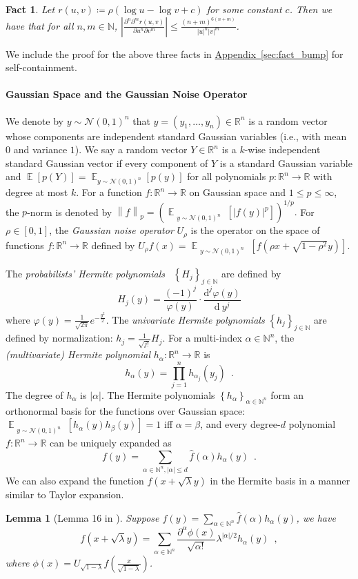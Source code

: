 \documentclass[12pt]{article}
\newtheorem{fact}[theorem]{Fact}
\newtheorem{lemma}[theorem]{Lemma}
\newcommand{\app}[1]{\hyperref[sec:#1]{Appendix~\ref*{sec:#1}}}
\newcommand{\N}{\mathbb{N}}  \newcommand{\R}{\mathbb{R}} \newcommand{\C}{\mathbb{C}} \newcommand{\U}{\mathbb{U}} \renewcommand{\d}{\mathrm{d}} \DeclareMathOperator*{\E}{\mathbb{E}}  \newcommand{\so}{\mathrm{SO}} \newcommand{\s}{\mathrm{S}} \newcommand{\su}{\mathrm{SU}} \renewcommand{\i}{\mathrm{i}} \newcommand{\A}{\mathcal{A}}  \newcommand{\B}{\mathcal{B}} \newcommand{\CC}{\mathcal{C}} \newcommand{\D}{\mathcal{D}} \newcommand{\F}{\mathcal{F}} \renewcommand{\H}{\mathcal{H}} \newcommand{\K}{\mathcal{K}} \newcommand{\NN}{\mathcal{N}} \newcommand{\V}{\mathcal{V}} \newcommand{\X}{\mathcal{X}} \newcommand{\Y}{\mathcal{Y}} \renewcommand{\S}{\mathcal{S}} \newcommand{\SR}{\mathcal{S}_{\R}} \newcommand{\SC}{\mathcal{S}_{\C}} \newcommand{\EE}{\mathcal{E}}  \newcommand{\PP}{\mathcal{P}} \newcommand{\KK}{\widetilde{K}} \newcommand{\LL}{\widetilde{L}} \newcommand{\W}{\widehat{W}} \newcommand{\f}{\hat{f}} \newcommand{\g}{\hat{g}} \newcommand{\h}{\hat{h}} \newcommand{\bit}[1]{\{0,1\}^{#1}} \newcommand{\wrt}{w.r.t.~} \newcommand{\us}{\overset{\$}{\leftarrow}} \newcommand{\set}[1]{\left\{#1\right\}} \newcommand{\lhs}{\mathrm{LHS}} \newcommand{\expec}[1]{\E\!\Br{#1}} \newcommand{\expect}[2]{\E_{\substack{#1}}\!\Br{#2}} \newcommand{\prob}[2]{\underset{#1}{\mathrm{Pr}}\!\Br{#2}} \newcommand{\cf}{\widetilde{f}} \newcommand{\cg}{\widetilde{g}} \newcommand{\ch}{\widetilde{h}} \newcommand{\ck}{\widetilde{K}} \newcommand{\rep}[2]{\br{#1}_{#2}} \newcommand{\AND}[1]{\mathrm{AND}\!\br{#1}}
\newcommand{\br}[1]{\left(#1\right)} \newcommand{\Br}[1]{\left[#1\right]} \newcommand{\st}[1]{\left\{#1\right\}} \newcommand{\tr}[1]{\mathrm{Tr}\!\Br{#1}} \newcommand{\abs}[1]{\left|#1 \right|} \newcommand{\norm}[1]{\left\lVert #1 \right\rVert} \newcommand{\agl}[2]{\theta^{\br{#1}}_{#2}} \newcommand{\aglp}[2]{{\theta'}^{\br{#1}}_{#2}} \newcommand{\lint}[1]{\left\lfloor#1\right\rfloor} \newcommand{\poly}[1]{\mathrm{poly}\!\br{#1}} \newcommand{\negl}[1]{\mathrm{negl}\!\br{#1}} \newcommand{\de}[1]{\mathrm{d}#1} \newcommand{\val}[1]{\mathrm{val}\!\br{#1}} \newcommand{\vall}[1]{\mathrm{val}\br{#1}} \newcommand{\nd}[1]{\mathcal{N}\!\br{#1}} \newcommand{\ketbratwo}[2]{\ket{#1} \hspace{-0.4em}\bra{#2}} \newcommand{\ketbra}[1]{\ketbratwo{#1}{#1}} \newcommand{\id}{\ensuremath{\mathds{1}}} \newcommand{\ogroup}[1]{\mathrm{O}\!\br{#1}} \newcommand{\ugroup}[1]{\mathrm{U}\!\br{#1}} \newcommand{\td}{\mathrm{TD}} \newcommand{\tv}[1]{\norm{#1}_{\mathrm{TV}}} \newcommand {\defeq} {\ensuremath{ \stackrel{\mathrm{def}}{=} }} \newcommand{\vdim}{\ensuremath{N}} \newcommand{\dimin}{\ensuremath{n}} \newcommand{\dimout}{\ensuremath{m}} \newcommand{\ncopy}{\ell} \newcommand{\hspacein}{\H_\mathrm{in}} \newcommand{\hspaceout}{\H_\mathrm{out}} \newcommand{\Sin}{\S(\hspacein)} \newcommand{\Sout}{\S(\hspaceout)} \newcommand{\haar}{\ensuremath{\mu}} \newcommand{\tensorhaar}{\ensuremath{\eta}} \newcommand{\tensorsrss}{\ensuremath{\nu}} \newcommand{\qadvice}{\ensuremath{\rho}} \newcommand{\tp}{\otimes} \newcommand{\wone}[2]{W_1\!\br{#1,#2}}
\begin{document}
\begin{fact}\label{fact:deri}
	Let $r(u,v) \coloneq \rho( \log u-\log v + c )$ for some constant $c$. Then we have that for all $n,m\in \N$,
	$ \abs{ \frac{ \partial^n \partial^m r(u,v) }{ \partial u^n \partial v^m } } \leq \frac{(n+m)^{6(n+m)}}{\abs{u}^n \abs{v}^m} $.
\end{fact}
\noindent We include the proof for the above three facts in \app{fact_bump} for self-containment.


\paragraph{Gaussian Space and the Gaussian Noise Operator}
We denote by $y\sim \NN(0,1)^n$ that $y = (y_1,\dots,y_n)\in\R^n$ is a random vector
whose components are independent standard Gaussian variables (i.e., with mean $0$ and variance $1$).
We say a random vector $Y\in\R^n$ is a $k$-wise independent standard Gaussian vector if every component of $Y$ is a standard Gaussian variable and
$\E[p(Y)] = \E_{y\sim \NN(0,1)^n}[p(y)]$ for all polynomials $p:\R^n\to \R$ with degree at most $k$.
For a function $f:\R^n\to \R$ on Gaussian space and $1\leq p\leq \infty$, the $p$-norm is denoted by
$
	\norm{f}_p = \br{\expect{y\sim \NN(0,1)^n}{\abs{f(y)}^p}}^{1/p}.
$
For $\rho\in[0,1]$, the \emph{Gaussian noise operator} $U_{\rho}$ is the operator on the space of functions $f:\R^n\to\R$ defined by
$
	U_{\rho}f(x) = \expect{y\sim \NN(0,1)^n}{f(\rho x+\sqrt{1-\rho^2}y)}.
$

The \emph{probabilists' Hermite polynomials}~\cite[Section 11]{O14} $\st{H_j}_{j\in\N}$ are defined by
\[
	H_j(y) = \frac{(-1)^{j}}{\varphi(y)}\cdot \frac{\mathrm{d}^j\varphi(y)}{\mathrm{d}\ y^j}
\]
where $\varphi(y)= \frac{1}{\sqrt{2\pi}}e^{-\frac{y^2}{2}}$.
The \emph{univariate Hermite polynomials} $\st{h_j}_{j\in\N}$ are defined by normalization: $h_{j} = \frac{1}{\sqrt{j!}}H_j$.
For a multi-index $\alpha\in\N^n$, the \emph{(multivariate) Hermite polynomial} $h_\alpha:\R^n\to \R$ is
\[
	h_\alpha(y) = \prod_{j=1}^n h_{\alpha_j}(y_j) \enspace.
\]
The degree of $h_\alpha$ is $\abs{\alpha}$.
The Hermite polynomials $\st{h_\alpha}_{\alpha\in\N^n}$ form an orthonormal basis for the functions over Gaussian space: $\expect{y\sim \NN(0,1)^n}{h_\alpha(y)h_\beta(y)} = 1$ iff $\alpha=\beta$, and every degree-$d$ polynomial $f:\R^n\to \R$ can be uniquely expanded as
\[
	f(y) = \sum_{\alpha\in\N^n, \abs{\alpha}\leq d} \widehat{f}(\alpha) h_{\alpha}(y)\enspace.
\]
We can also expand the function $f(x+\sqrt{\lambda} y)$ in the Hermite basis in a manner similar to Taylor expansion.
\begin{lemma}[Lemma 16 in \cite{KM22}]\label{lem:expanding}
Suppose $f(y) = \sum_{\alpha\in\N^n} \widehat{f}(\alpha) h_{\alpha}(y)$, we have
\[
	f(x+\sqrt{\lambda} y) =
	\sum_{\alpha\in\N^n} \frac{\partial^{\alpha}\phi(x)}{\sqrt{\alpha!}} \lambda^{\abs{\alpha}/2} h_{\alpha}(y) \enspace,
\]
where $\phi(x) = U_{\sqrt{1-\lambda}} f\br{\frac{x}{\sqrt{1-\lambda}}}$.
\end{lemma}
\end{document}
